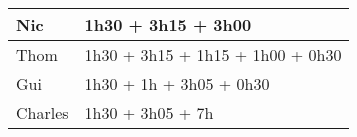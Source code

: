 \begin{table}[ht]
    \centering
    \begin{tabular}{|l|l|}
    \hline
        Nic & 1h30 + 3h15 + 3h00 \\
    \hline
        Thom & 1h30 + 3h15 + 1h15 + 1h00 + 0h30 \\
    \hline
        Gui & 1h30 + 1h + 3h05 + 0h30 \\
    \hline
        Charles & 1h30 + 3h05 + 7h \\
    \hline
    \end{tabular}
\end{table}